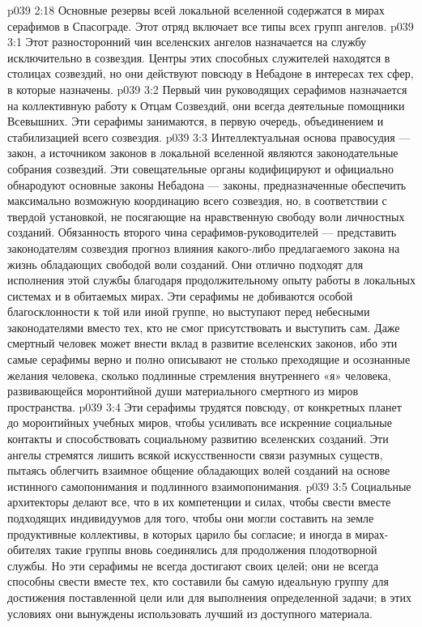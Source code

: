 \vs p039 2:18 \pc Основные резервы всей локальной вселенной содержатся в мирах серафимов в Спасограде. Этот отряд включает все типы всех групп ангелов.
\vs p039 3:1 Этот разносторонний чин вселенских ангелов назначается на службу исключительно в созвездия. Центры этих способных служителей находятся в столицах созвездий, но они действуют повсюду в Небадоне в интересах тех сфер, в которые назначены.
\vs p039 3:2 \pc {}\bibnobreakspace {} Первый чин руководящих серафимов назначается на коллективную работу к Отцам Созвездий, они всегда деятельные помощники Всевышних. Эти серафимы занимаются, в первую очередь, объединением и стабилизацией всего созвездия.
\vs p039 3:3 \pc {}\bibnobreakspace {} Интеллектуальная основа правосудия --- закон, а источником законов в локальной вселенной являются законодательные собрания созвездий. Эти совещательные органы кодифицируют и официально обнародуют основные законы Небадона --- законы, предназначенные обеспечить максимально возможную координацию всего созвездия, но, в соответствии с твердой установкой, не посягающие на нравственную свободу воли личностных созданий. Обязанность второго чина серафимов\hyp{}руководителей --- представить законодателям созвездия прогноз влияния какого\hyp{}либо предлагаемого закона на жизнь обладающих свободой воли созданий. Они отлично подходят для исполнения этой службы благодаря продолжительному опыту работы в локальных системах и в обитаемых мирах. Эти серафимы не добиваются особой благосклонности к той или иной группе, но выступают перед небесными законодателями вместо тех, кто не смог присутствовать и выступить сам. Даже смертный человек может внести вклад в развитие вселенских законов, ибо эти самые серафимы верно и полно описывают не столько преходящие и осознанные желания человека, сколько подлинные стремления внутреннего «я» человека, развивающейся моронтийной души материального смертного из миров пространства.
\vs p039 3:4 \pc {}\bibnobreakspace {} Эти серафимы трудятся повсюду, от конкретных планет до моронтийных учебных миров, чтобы усиливать все искренние социальные контакты и способствовать социальному развитию вселенских созданий. Эти ангелы стремятся лишить всякой искусственности связи разумных существ, пытаясь облегчить взаимное общение обладающих волей созданий на основе истинного самопонимания и подлинного взаимопонимания.
\vs p039 3:5 Социальные архитекторы делают все, что в их компетенции и силах, чтобы свести вместе подходящих индивидуумов для того, чтобы они могли составить на земле продуктивные коллективы, в которых царило бы согласие; и иногда в мирах\hyp{}обителях такие группы вновь соединялись для продолжения плодотворной службы. Но эти серафимы не всегда достигают своих целей; они не всегда способны свести вместе тех, кто составили бы самую идеальную группу для достижения поставленной цели или для выполнения определенной задачи; в этих условиях они вынуждены использовать лучший из доступного материала.
